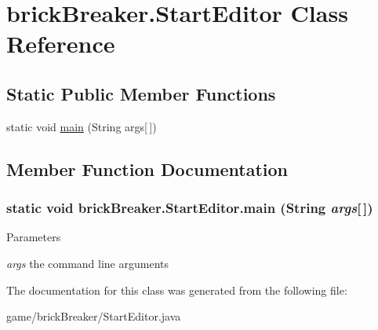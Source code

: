 \hypertarget{classbrick_breaker_1_1_start_editor}{
\section{brickBreaker.StartEditor Class Reference}
\label{classbrick_breaker_1_1_start_editor}
}
\subsection*{Static Public Member Functions}
\begin{DoxyCompactItemize}
\item 
static void \hyperlink{classbrick_breaker_1_1_start_editor_a2e6924e9e8162a7b1976ce5d01478bee}{main} (String args\mbox{[}$\,$\mbox{]})
\end{DoxyCompactItemize}


\subsection{Member Function Documentation}
\hypertarget{classbrick_breaker_1_1_start_editor_a2e6924e9e8162a7b1976ce5d01478bee}{
\subsubsection[{main}]{\setlength{\rightskip}{0pt plus 5cm}static void brickBreaker.StartEditor.main (String {\em args}\mbox{[}$\,$\mbox{]})}}
\label{classbrick_breaker_1_1_start_editor_a2e6924e9e8162a7b1976ce5d01478bee}

\begin{DoxyParams}{Parameters}
\item[{\em args}]the command line arguments \end{DoxyParams}


The documentation for this class was generated from the following file:\begin{DoxyCompactItemize}
\item 
game/brickBreaker/StartEditor.java\end{DoxyCompactItemize}
